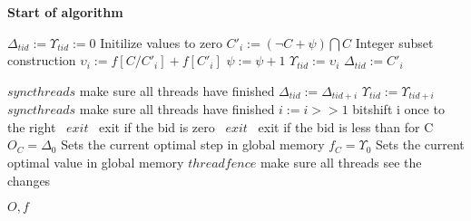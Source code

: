 \documentclass[a4paper, 12pt, notitlepage]{report}
\begin{document}
\newpage
\pagebreak
\textbf{Start of algorithm}
\begin{algorithmic}[1]
\STATE $\Delta _{tid} := \Upsilon _{tid} := 0$ \hfill Initilize values to zero
\IF{$\psi \leq \Psi$} 
\STATE $C'_{i} := (\neg C+\psi) \bigcap C$ \hfill Integer subset construction
\STATE $\upsilon _{i} := f[C/C'_{i}]+f[C'_{i}]$
\ENDIF 
\STATE $\psi := \psi + 1$
\STATE $\Upsilon _{tid} := \upsilon _{i}$
\STATE $\Delta _{tid} := C'_{i}$
\ENDIF
\ENDFOR
\ENDIF

\STATE $syncthreads$ \hfill make sure all threads have finished
\STATE $\Delta _{tid} := \Delta _{tid+i}$
\STATE $\Upsilon _{tid} := \Upsilon _{tid+i}$
\ENDIF
\ENDIF
\STATE $syncthreads$ \hfill make sure all threads have finished
\STATE $i := i >> 1$ \hfill bitshift i once to the right
\ENDFOR
{}
\STATE{} \algorithmicthen\ {$ exit$}
\algorithmicend\ \algorithmicif \hfill exit if the bid is zero
\STATE{} \algorithmicthen\ {$ exit$} 
\algorithmicend\ \algorithmicif \hfill exit if the bid is less than for C
\STATE $O_C = \Delta _0$ \hfill Sets the current optimal step in global memory
\STATE $f_C = \Upsilon _0$ \hfill Sets the current optimal value in global memory
\STATE $threadfence$ \hfill make sure all threads see the changes
\ENDIF

\ENDIF
\RETURN $O,f$
\end{algorithmic}
\end{document}
